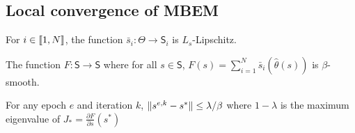 \subsection{Local convergence of MBEM}
\begin{assumption}
For $i \in \llbracket1,N\rrbracket$,  the function $\bar{s}_i: \Theta \to \mathsf{S}_i$ is $L_s$-Lipschitz.
\end{assumption}

\begin{assumption}
The function $F: \mathsf{S} \to \mathsf{S}$ where for all $s \in  \mathsf{S}$, $F(s) = \sum_{i=1}^N \bar{s}_i (\hat{\theta}(s))$ is $\beta$-smooth.
\end{assumption}
\begin{assumption}\label{ass:local}
For any epoch $e$ and iteration $k$, $\lVert s^{e,k} - s^*\rVert \leq \lambda/\beta$ where $1-\lambda$ is the maximum eigenvalue of $J_* = \frac{\partial F}{\partial s}(s^*)$ 
\end{assumption}

